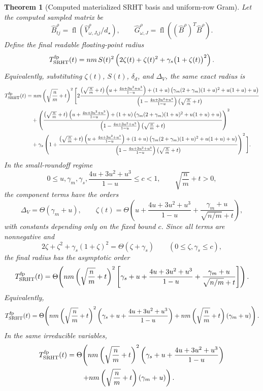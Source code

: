 \documentclass[11pt]{article}
\newcommand{\fl}{\operatorname{fl}}
\newtheorem{theorem}{Theorem}
\theoremstyle{remark}
\begin{document}
\begin{theorem}[Computed materialized SRHT basis and uniform-row Gram]
Let the computed sampled matrix be
\[
  \widehat B^\rho_{tj}
  =
  \fl\!\left(\widehat V^\rho_{\omega,J_tj}/\widehat d_\star\right),
  \qquad
  \widehat G_{\omega,J}^\rho
  =
  \fl\!\left((\widehat B^\rho)^T\widehat B^\rho\right).
\]
Define the final readable floating-point radius
\[
  T_{\rm SRHT}^{\rm fp}(t)
  =
  nm\,S(t)^2
  \left(
    2\zeta(t)+\zeta(t)^2
    +
    \gamma_s\bigl(1+\zeta(t)\bigr)^2
  \right).
\]
Equivalently, substituting \(\zeta(t)\), \(S(t)\), \(\delta_d\), and
\(\Delta_V\), the same exact radius is
\begingroup
\small
\[
\begin{aligned}
  T_{\rm SRHT}^{\rm fp}(t)
  &=
  nm\left(\sqrt{\frac nm}+t\right)^2
  \Bigg[
    2
    \frac{
      \left(\sqrt{\frac nm}+t\right)
      \left(u+\frac{4u+3u^2+u^3}{1-u}\right)
      +(1+u)
      \left(\gamma_m(2+\gamma_m)(1+u)^2+u(1+u)+u\right)
    }{
      \left(1-\frac{4u+3u^2+u^3}{1-u}\right)
      \left(\sqrt{\frac nm}+t\right)
    }
  \\
  &\quad+
    \left(
    \frac{
      \left(\sqrt{\frac nm}+t\right)
      \left(u+\frac{4u+3u^2+u^3}{1-u}\right)
      +(1+u)
      \left(\gamma_m(2+\gamma_m)(1+u)^2+u(1+u)+u\right)
    }{
      \left(1-\frac{4u+3u^2+u^3}{1-u}\right)
      \left(\sqrt{\frac nm}+t\right)
    }
    \right)^2
  \\
  &\quad+
    \gamma_s
    \left(
      1+
      \frac{
        \left(\sqrt{\frac nm}+t\right)
        \left(u+\frac{4u+3u^2+u^3}{1-u}\right)
        +(1+u)
        \left(\gamma_m(2+\gamma_m)(1+u)^2+u(1+u)+u\right)
      }{
        \left(1-\frac{4u+3u^2+u^3}{1-u}\right)
        \left(\sqrt{\frac nm}+t\right)
      }
    \right)^2
  \Bigg].
\end{aligned}
\]
\endgroup
In the small-roundoff regime
\[
  0\le u,\gamma_m,\gamma_s,\frac{4u+3u^2+u^3}{1-u}\le c<1,
  \qquad \sqrt{\frac nm}+t>0,
\]
the component terms have the orders
\[
  \Delta_V=\Theta(\gamma_m+u),
  \qquad
  \zeta(t)
  =
  \Theta\!\left(
    u+\frac{4u+3u^2+u^3}{1-u}
    +\frac{\gamma_m+u}{\sqrt{n/m}+t}
  \right),
\]
with constants depending only on the fixed bound \(c\).  Since all terms are
nonnegative and
\[
  2\zeta+\zeta^2+\gamma_s(1+\zeta)^2
  =
  \Theta(\zeta+\gamma_s)
  \qquad(0\le \zeta,\gamma_s\le c),
\]
the final radius has the asymptotic order
\[
  T_{\rm SRHT}^{\rm fp}(t)
  =
  \Theta\!\left(
    nm\left(\sqrt{\frac nm}+t\right)^2
    \left[
      \gamma_s+u+\frac{4u+3u^2+u^3}{1-u}
      +\frac{\gamma_m+u}{\sqrt{n/m}+t}
    \right]
  \right).
\]
Equivalently,
\[
  T_{\rm SRHT}^{\rm fp}(t)
  =
  \Theta\!\left(
    nm\left(\sqrt{\frac nm}+t\right)^2
      \left(\gamma_s+u+\frac{4u+3u^2+u^3}{1-u}\right)
    +
    nm\left(\sqrt{\frac nm}+t\right)(\gamma_m+u)
  \right).
\]
In the same irreducible variables,
\[
\begin{aligned}
  T_{\rm SRHT}^{\rm fp}(t)
  &=
  \Theta\!\left(
    nm\left(\sqrt{\frac nm}+t\right)^2
    \left(\gamma_s+u+\frac{4u+3u^2+u^3}{1-u}\right)
  \right.
  \\
  &\qquad\left.
    +
    nm\left(\sqrt{\frac nm}+t\right)(\gamma_m+u)
  \right).
\end{aligned}
\]


\end{theorem}
\end{document}
